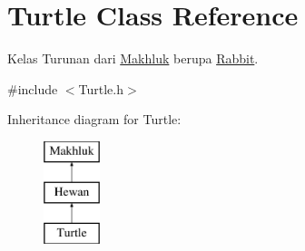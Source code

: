 \hypertarget{class_turtle}{}\section{Turtle Class Reference}
\label{class_turtle}


Kelas Turunan dari \hyperlink{class_makhluk}{Makhluk} berupa \hyperlink{class_rabbit}{Rabbit}.  




{\ttfamily \#include $<$Turtle.\+h$>$}

Inheritance diagram for Turtle\+:\begin{figure}[H]
\begin{center}
\leavevmode
\includegraphics[height=3.000000cm]{class_turtle}
\end{center}
\end{figure}
